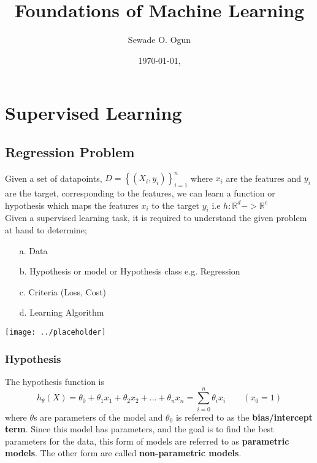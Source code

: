 \documentclass[12pt,a4paper,titlepage,landscape]{book}
\author{Sewade O. Ogun}
\title{Foundations of Machine Learning}
\date{\today, \text{AIMS Ghana}}
\begin{document}
	\maketitle
	
	\chapter{Supervised Learning}
	\section{Regression Problem}
	
	Given a set of datapoints, $ D = \left\{\left(X_i, y_i\right)\right\}_{i=1}^n $ where $x_i$ are the features and $y_i$ are the target, corresponding to the features, we can learn a function or hypothesis which maps the features $x_i$ to the target $y_i$ i.e $h : \mathbb{R}^d -> \mathbb{R}^c $ \\
	
	Given a supervised learning task, it is required to understand the given problem at hand to determine; \\
	\begin{enumerate}
		\item [a.] Data
		\item [b.] Hypothesis or model or Hypothesis class e.g. Regression
		\item [c.] Criteria (Loss, Cost)
		\item[d.] Learning Algorithm
	\end{enumerate}
\begin{center}
	\texttt{[image: ../placeholder]}
\end{center}
	
	\subsection{Hypothesis}
	The hypothesis function is \\
	\begin{equation}
		h_{\theta}(X) = \theta_0 + \theta_1x_1 + \theta_2x_2 + ... + \theta_nx_n
		= \sum_{i=0}^{n}\theta_ix_i \qquad (x_0=1)
	\end{equation}
	where $\theta$s are parameters of the model and $\theta_0$ is referred to as the \textbf{bias/intercept term}. Since this model has parameters, and the goal is to find the best parameters for the data, this form of models are referred to as \textbf{parametric models}. The other form are called \textbf{non-parametric models}.
	
\end{document}
